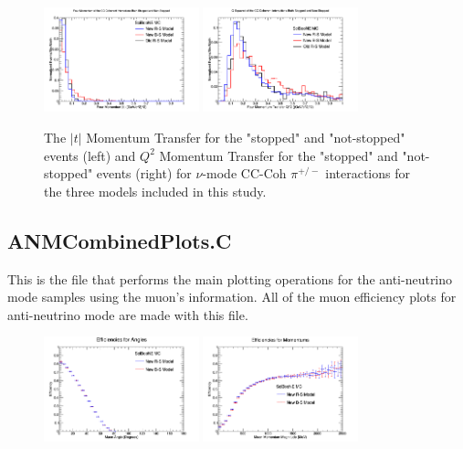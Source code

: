 \documentclass[11pt]{article}
\begin{document}
\begin{figure}[H]
\centering
\includegraphics[width=0.4\textwidth]{CCCohPlots/NMCCCohGoodT.png}
\includegraphics[width=0.4\textwidth]{CCCohPlots/NMCCCohGoodQ2.png}
\caption{The $|t|$ Momentum Transfer for the "stopped" and "not-stopped" events (left) and $Q^2$ Momentum Transfer for the "stopped" and "not-stopped" events (right) for $\nu$-mode CC-Coh $\pi^{+/-}$ interactions for the three models included in this study.}
\end{figure}

\subsection{ANMCombinedPlots.C}
This is the file that performs the main plotting operations for the anti-neutrino mode samples using the muon's information. All of the muon efficiency plots for anti-neutrino mode are made with this file.

\begin{figure}[H]
\centering
\includegraphics[width=0.4\textwidth]{ANMCombinedPlotsImages/15-ANMCombinedPlots.png}
\includegraphics[width=0.4\textwidth]{ANMCombinedPlotsImages/16-ANMCombinedPlots.png}
\caption{}
\end{figure}
\end{document}
